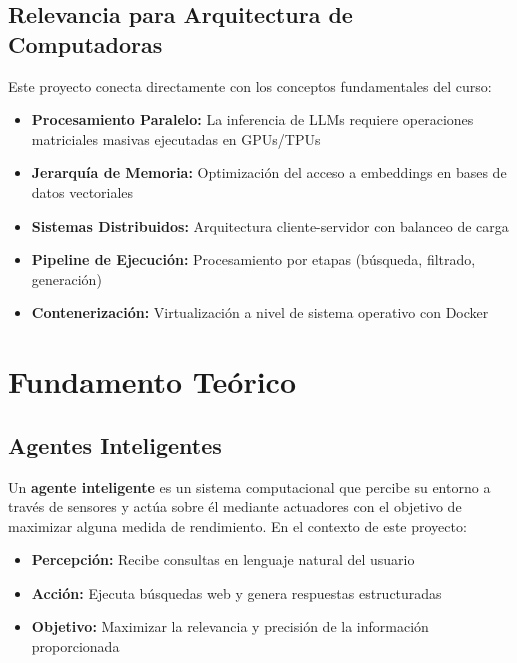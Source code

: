 \documentclass[12pt,a4paper]{article}
\begin{document}
\subsection{Relevancia para Arquitectura de Computadoras}

Este proyecto conecta directamente con los conceptos fundamentales del curso:

\begin{itemize}
    \item \textbf{Procesamiento Paralelo:} La inferencia de LLMs requiere operaciones matriciales masivas ejecutadas en GPUs/TPUs
    \item \textbf{Jerarquía de Memoria:} Optimización del acceso a embeddings en bases de datos vectoriales
    \item \textbf{Sistemas Distribuidos:} Arquitectura cliente-servidor con balanceo de carga
    \item \textbf{Pipeline de Ejecución:} Procesamiento por etapas (búsqueda, filtrado, generación)
    \item \textbf{Contenerización:} Virtualización a nivel de sistema operativo con Docker
\end{itemize}

\newpage

\section{Fundamento Teórico}

\subsection{Agentes Inteligentes}

Un \textbf{agente inteligente} es un sistema computacional que percibe su entorno a través de sensores y actúa sobre él mediante actuadores con el objetivo de maximizar alguna medida de rendimiento. En el contexto de este proyecto:

\begin{itemize}
    \item \textbf{Percepción:} Recibe consultas en lenguaje natural del usuario
    \item \textbf{Acción:} Ejecuta búsquedas web y genera respuestas estructuradas
    \item \textbf{Objetivo:} Maximizar la relevancia y precisión de la información proporcionada
\end{itemize}
\end{document}
